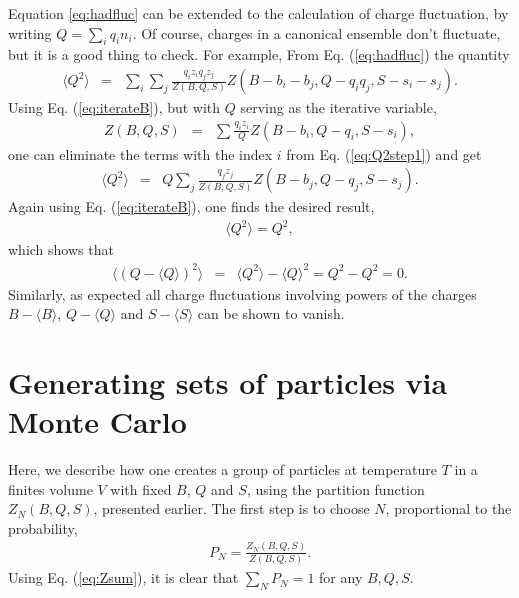 \documentclass[letterpaper,aps,showpacs,floatfix,10pt,prc]{revtex4-1}
\begin{document}
Equation \ref{eq:hadfluc} can be extended to the calculation of charge fluctuation, by writing $Q=\sum_i q_in_i$.  Of course, charges in a canonical ensemble don't fluctuate, but it is a good thing to check. For example, From Eq. (\ref{eq:hadfluc}) the quantity 
\begin{eqnarray}
\label{eq:Q2step1}
\langle Q^2\rangle&=&
\sum_i\sum_j \frac{q_iz_iq_jz_j}{Z(B,Q,S)}Z(B-b_i-b_j,Q-q_iq_j,S-s_i-s_j).
\end{eqnarray}
Using Eq. (\ref{eq:iterateB}), but with $Q$ serving as the iterative variable,
\begin{eqnarray}
Z(B,Q,S)&=&\sum\frac{q_iz_i}{Q}Z(B-b_i,Q-q_i,S-s_i),
\end{eqnarray}
one can eliminate the terms with the index $i$ from Eq. (\ref{eq:Q2step1}) and get
\begin{eqnarray}
\langle Q^2\rangle&=&Q
\sum_j\frac{q_jz_j}{Z(B,Q,S)}Z(B-b_j,Q-q_j,S-s_j).
\end{eqnarray}
Again using Eq. (\ref{eq:iterateB}), one finds the desired result,
\begin{eqnarray}
\langle Q^2\rangle=Q^2,
\end{eqnarray}
which shows that
\begin{eqnarray}
\langle(Q-\langle Q\rangle)^2\rangle &=&\langle Q^2\rangle-\langle Q\rangle^2
=Q^2-Q^2=0.
\end{eqnarray}
Similarly, as expected all charge fluctuations involving powers of the charges $B-\langle B\rangle$, $Q-\langle Q\rangle$ and $S-\langle S\rangle$ can be shown to vanish.

\section{Generating sets of particles via Monte Carlo}

Here, we describe how one creates a group of particles at temperature $T$ in a finites volume $V$ with fixed $B$, $Q$ and $S$, using the partition function $Z_N(B,Q,S)$, presented earlier. The first step is to choose $N$, proportional to the probability,
\begin{eqnarray}
P_N=\frac{Z_N(B,Q,S)}{Z(B,Q,S)}.
\end{eqnarray}
Using Eq. (\ref{eq:Zsum}), it is clear that $\sum_N P_N=1$ for any $B,Q,S$. 
\end{document}
